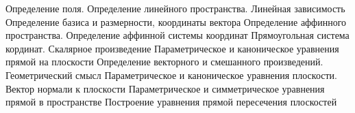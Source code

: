 Определение поля. Определение линейного пространства. Линейная зависимость
Определение базиса и размерности, координаты вектора
Определение аффинного пространства. Определение аффинной системы координат
Прямоугольная система кординат. Скалярное произведение
Параметрическое и каноническое уравнения прямой на плоскости
Определение векторного и смешанного произведений. Геометрический смысл
Параметрическое и каноническое уравнения плоскости. Вектор нормали к плоскости
Параметрическое и симметрическое уравнения прямой в пространстве
Построение уравнения прямой пересечения плоскостей